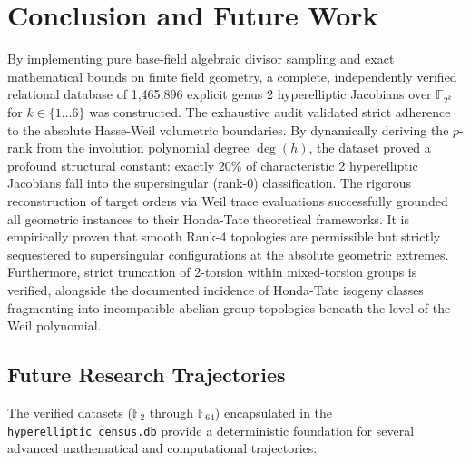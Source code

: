 \documentclass[11pt,letterpaper]{article}
\begin{document}
\section{Conclusion and Future Work}
By implementing pure base-field algebraic divisor sampling and exact mathematical bounds on finite field geometry, a complete, independently verified relational database of 1,465,896 explicit genus 2 hyperelliptic Jacobians over $\mathbb{F}_{2^k}$ for $k \in \{1 \dots 6\}$ was constructed. The exhaustive audit validated strict adherence to the absolute Hasse-Weil volumetric boundaries. By dynamically deriving the $p$-rank from the involution polynomial degree $\deg(h)$, the dataset proved a profound structural constant: exactly 20\% of characteristic 2 hyperelliptic Jacobians fall into the supersingular (rank-0) classification. The rigorous reconstruction of target orders via Weil trace evaluations successfully grounded all geometric instances to their Honda-Tate theoretical frameworks. It is empirically proven that smooth Rank-4 topologies are permissible but strictly sequestered to supersingular configurations at the absolute geometric extremes. Furthermore, strict truncation of 2-torsion within mixed-torsion groups is verified, alongside the documented incidence of Honda-Tate isogeny classes fragmenting into incompatible abelian group topologies beneath the level of the Weil polynomial. 

\subsection{Future Research Trajectories}
The verified datasets ($\mathbb{F}_2$ through $\mathbb{F}_{64}$) encapsulated in the \texttt{hyperelliptic\_census.db} provide a deterministic foundation for several advanced mathematical and computational trajectories:
\end{document}
